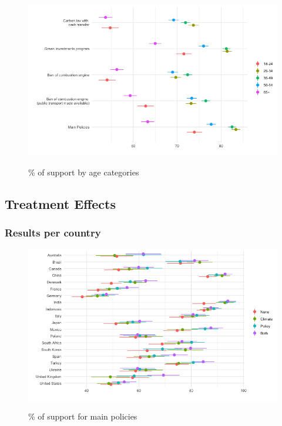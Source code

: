 \begin{frame}{}%
\begin{figure}[h!]
\caption{\% of support by age categories} %
\includegraphics[width=.7\paperwidth]{../figures/country_comparison/main_support_var_by_treatment_age_all.png} \\
\end{figure}
\end{frame}
\subsection{Treatment Effects}

\subsubsection{Results per country}

\begin{frame}{}%
\begin{figure}[h!]
\caption{\% of support for main policies} %
\includegraphics[width=.7\paperwidth]{../figures/country_comparison/main_policies_support_treatment_each_country.png} \\
\end{figure}
\end{frame}

